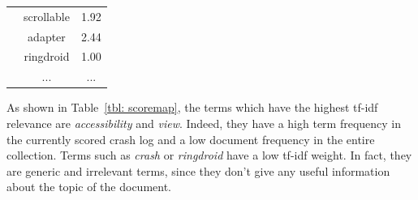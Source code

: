 \begin{table}[tb]
\begin{tabular}{l|c|c|}
                                                                                                            & scrollable                            & 1.92                                  \\ \cline{2-3} 
                                                                                                            & adapter                               & 2.44                                  \\ \cline{2-3} 
                                                                                                            & ringdroid                             & 1.00                                  \\ \cline{2-3} 
                                                                                                            & ...                             & ...                                  
\end{tabular}
\end{table}

As shown in Table~\ref{tbl: scoremap}, the terms which have the highest tf-idf relevance are \textit{accessibility} and \textit{view}. Indeed, they have a high term frequency in the currently scored crash log and a low document frequency in the entire collection. 
Terms such as \textit{crash} or \textit{ringdroid} have a low tf-idf weight. In fact, they are generic and irrelevant terms, since they don't give any useful information about the topic of the document. \\

